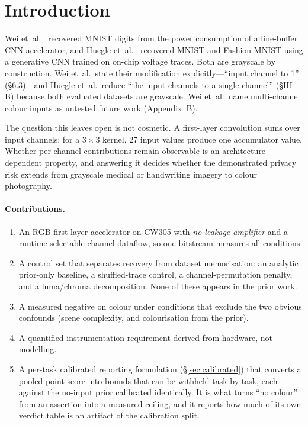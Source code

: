 \documentclass[10pt,conference]{article}
\begin{document}
\section{Introduction}

Wei et~al.~\cite{wei2018} recovered MNIST digits from the power consumption of a
line-buffer CNN accelerator, and Huegle et~al.~\cite{huegle2023} recovered MNIST and
Fashion-MNIST using a generative CNN trained on on-chip voltage traces. Both are
grayscale by construction. Wei et~al.\ state their modification explicitly---``input
channel to 1'' (\S6.3)---and Huegle et~al.\ reduce ``the input channels to a single
channel'' (\S III-B) because both evaluated datasets are grayscale. Wei et~al.\ name
multi-channel colour inputs as untested future work (Appendix~B).

The question this leaves open is not cosmetic. A first-layer convolution sums over input
channels: for a $3\times3$ kernel, 27 input values produce one accumulator value. Whether
per-channel contributions remain observable is an architecture-dependent property, and
answering it decides whether the demonstrated privacy risk extends from grayscale
medical or handwriting imagery to colour photography.

\paragraph{Contributions.}
\begin{enumerate}
\item An RGB first-layer accelerator on CW305 with \emph{no leakage amplifier} and a
runtime-selectable channel dataflow, so one bitstream measures all conditions.
\item A control set that separates recovery from dataset memorisation: an analytic
prior-only baseline, a shuffled-trace control, a channel-permutation penalty, and a
luma/chroma decomposition. None of these appears in the prior work.
\item A measured negative on colour under conditions that exclude the two obvious
confounds (scene complexity, and colourisation from the prior).
\item A quantified instrumentation requirement derived from hardware, not modelling.
\item A per-task calibrated reporting formulation (\S\ref{sec:calibrated}) that
converts a pooled point score into bounds that can be withheld task by task, each
against the no-input prior calibrated identically. It is what turns ``no colour'' from
an assertion into a measured ceiling, and it reports how much of its own verdict table
is an artifact of the calibration split.
\end{enumerate}
\end{document}
